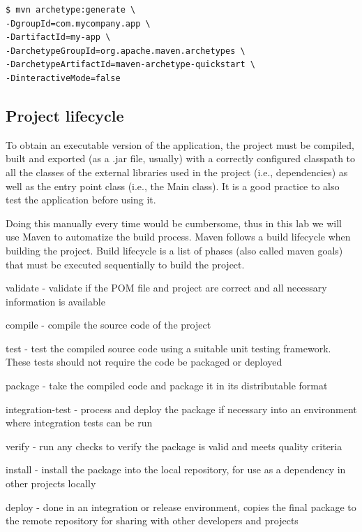 \documentclass{article}
\begin{document}
\begin{lstlisting}
$ mvn archetype:generate \
-DgroupId=com.mycompany.app \
-DartifactId=my-app \
-DarchetypeGroupId=org.apache.maven.archetypes \
-DarchetypeArtifactId=maven-archetype-quickstart \
-DinteractiveMode=false
\end{lstlisting}

\subsection{Project lifecycle}

To obtain an executable version of the application, the project must be
compiled, built and exported (as a .jar file, usually) with a
correctly configured classpath to all the classes of the
external libraries used in the project (i.e., dependencies) as well 
as the entry point class (i.e., the Main class). It is a
good practice to also test the application before using it.

Doing this manually every time would be cumbersome, thus in this
lab we will use Maven to automatize the build process.
Maven follows a build lifecycle when building the project. Build
lifecycle is a list of phases (also called maven goals) that must be
executed sequentially to build the project.

\begin{compactitem}
\item validate - validate if the POM file and project are correct and
  all necessary information is available

\item compile - compile the source code of the project

\item test - test the compiled source code using a suitable unit
  testing framework. These tests should not require the code be
  packaged or deployed

\item package - take the compiled code and package it in its
  distributable format

\item integration-test - process and deploy the package if necessary
  into an environment where integration tests can be run

\item verify - run any checks to verify the package is valid and meets
  quality criteria
 
\item install - install the package into the local repository, for use
  as a dependency in other projects locally 

\item deploy - done in an integration or release environment, copies
  the final package to the remote repository for sharing with other
  developers and projects

\end{compactitem}
\end{document}
